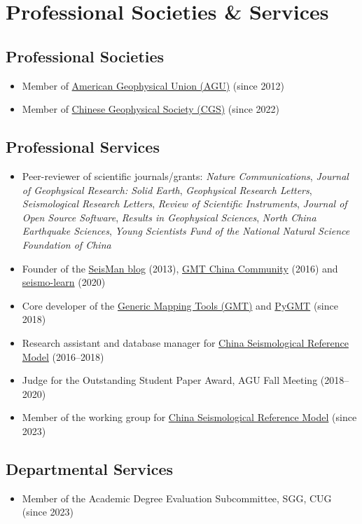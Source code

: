 \section{Professional Societies \& Services}

\subsection{Professional Societies}
\begin{itemize}
\item Member of \href{https://sites.agu.org/}{American Geophysical Union (AGU)} (since 2012)
\item Member of \href{http://www.cgscgs.org.cn/}{Chinese Geophysical Society (CGS)} (since 2022)
\end{itemize}

\subsection{Professional Services}
\begin{itemize}
\item Peer-reviewer of scientific journals/grants:
      \emph{Nature Communications},
      \emph{Journal of Geophysical Research: Solid Earth},
      \emph{Geophysical Research Letters},
      \emph{Seismological Research Letters},
      \emph{Review of Scientific Instruments},
      \emph{Journal of Open Source Software},
      \emph{Results in Geophysical Sciences},
      \emph{North China Earthquake Sciences},
      \emph{Young Scientists Fund of the National Natural Science Foundation of China}
\item Founder of the \href{https://blog.seisman.info}{SeisMan blog} (2013),
      \href{http://gmt-china.org/}{GMT China Community} (2016)
      and \href{https://seismo-learn.org/}{seismo-learn} (2020)
\item Core developer of the \href{https://github.com/GenericMappingTools/gmt}{Generic Mapping Tools (GMT)} and
      \href{https://github.com/GenericMappingTools/pygmt}{PyGMT} (since 2018)
\item Research assistant and database manager for \href{http://chinageorefmodel.org/}{China Seismological Reference Model} (2016--2018)
\item Judge for the Outstanding Student Paper Award, AGU Fall Meeting (2018--2020)
\item Member of the working group for \href{http://chinageorefmodel.org/}{China Seismological Reference Model} (since 2023)
\end{itemize}

\subsection{Departmental Services}
\begin{itemize}
\item Member of the Academic Degree Evaluation Subcommittee, SGG, CUG (since 2023)
\end{itemize}
